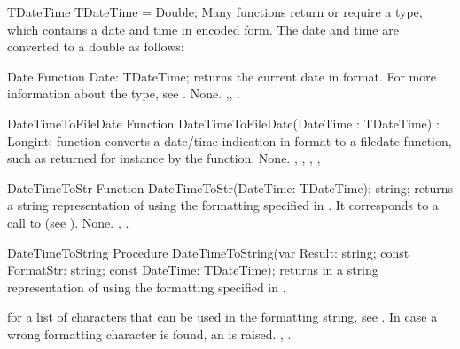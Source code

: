 \begin{type}{TDateTime}
\Declaration
  TDateTime = Double;
\Description
Many functions return or require a  type, which contains
a date and time in encoded form. The date and time are converted to a double
as follows:
\end{type}

\begin{function}{Date}
\Declaration
Function Date: TDateTime;
\Description
{} returns the current date in  format. 
For more information about the  type, see .
\Errors
None.
\SeeAlso
{},, .
\end{function}

\html{}

\begin{function}{DateTimeToFileDate}
\Declaration
Function DateTimeToFileDate(DateTime : TDateTime) : Longint;
\Description
{} function converts a date/time indication in
 format to a filedate function, such as returned for 
instance by the  function.
\Errors
None.
\SeeAlso
{}, , ,
, 
\end{function}

\html{}
 
\begin{function}{DateTimeToStr}
\Declaration
Function DateTimeToStr(DateTime: TDateTime): string;
\Description
{} returns a string representation of 
 using the formatting specified in
. It corresponds to a call to 
 (see ).
\Errors
None.
\SeeAlso
{}, .
\end{function}

\html{}
 
\begin{procedure}{DateTimeToString}
\Declaration
Procedure DateTimeToString(var Result: string; const FormatStr: string; const DateTime: TDateTime);
\Description
{} returns in  a string representation of 
 using the formatting specified in . 

for a list of characters that can be used in the  formatting
string, see .
\Errors
In case a wrong formatting character is found, an  is
raised.
\SeeAlso
{}, .
\end{procedure}

